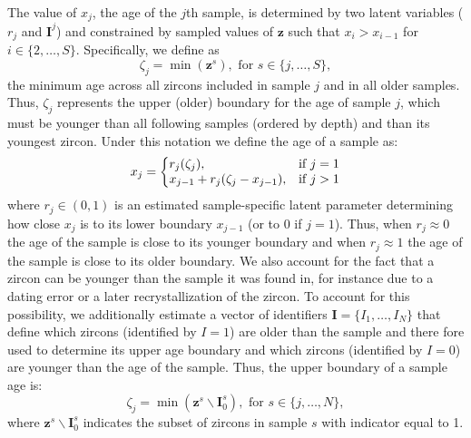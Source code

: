 \documentclass[12pt,letterpaper]{article}
\begin{document}
The value of $x_j$, the age of the $j$th sample, is determined by two latent variables ($r_j$ and $\mathbf{I}^j$) and constrained by sampled values of $\mathbf{z}$ such that $x_{i} > x_{i - 1}$ for $i \in \{2, \dots, S\}$.
Specifically, we define as 
\begin{equation}
\zeta_j = \min(\mathbf{z}^{s}), \text{ for } s \in \{j, \dots, S\},
\end{equation}
the minimum age across all zircons included in sample $j$ and in all older samples. 
Thus, $\zeta_j$ represents the upper (older) boundary for the age of sample $j$, which must be younger than all following samples (ordered by depth) and than its youngest zircon.
Under this notation we define the age of a sample as: 
\begin{equation}
x_j = \left\{
\begin{array}{@{}ll@{}}
    r_j (\zeta_j), & \text{if}\ j = 1 \\
    x_{j - 1} + r_j (\zeta_j - x_{j - 1}), & \text{if}\ j > 1 \\
\end{array}\right.
\end{equation}
where $r_j \in (0, 1)$ is an estimated sample-specific latent parameter determining how close $x_{j}$ is to its lower boundary $x_{j - 1}$ (or to 0 if $j = 1$). 
Thus, when $r_j \approx 0$ the age of the sample is close to its younger boundary and when $r_j \approx 1$ the age of the sample is close to its older boundary. 
%
We also account for the fact that a zircon can be younger than the sample it was found in, for instance due to a dating error or a later recrystallization of the zircon. 
To account for this possibility, we additionally estimate a vector of identifiers $\mathbf{I} = \{I_1, \dots, I_N\}$ that define which zircons (identified by $I = 1$) are older than the sample and there fore used to determine  its upper age boundary  and which zircons (identified by $I = 0$) are younger than the age of the sample. 
Thus, the upper boundary of a sample age is:
\begin{equation}
\zeta_j = \min(\mathbf{z}^{s} \backslash \mathbf{I}^s_0), \text{ for } s \in \{j, \dots, N \}, 
\end{equation}
where $\mathbf{z}^{s} \backslash \mathbf{I}^s_0$ indicates the subset of zircons in sample $s$ with indicator equal to 1. 
\end{document}
